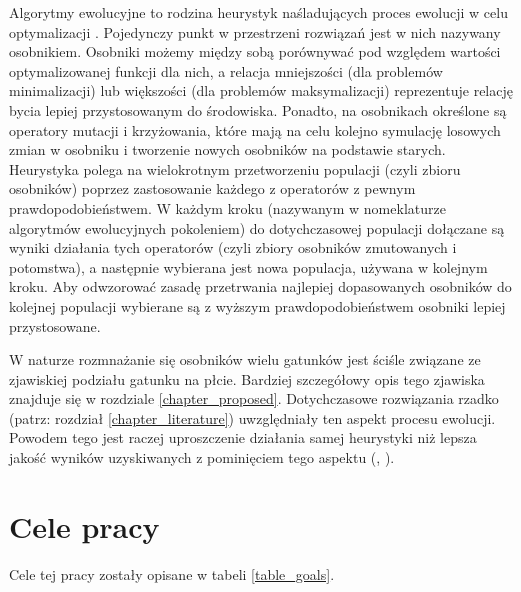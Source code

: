 \documentclass[twoside]{iisthesis}
\begin{document}
Algorytmy ewolucyjne to rodzina heurystyk naśladujących proces ewolucji w celu optymalizacji \cite{davis1991handbook}. Pojedynczy punkt w przestrzeni rozwiązań jest w nich nazywany osobnikiem. Osobniki możemy między sobą porównywać pod względem wartości optymalizowanej funkcji dla nich, a relacja mniejszości (dla problemów minimalizacji) lub większości (dla problemów maksymalizacji) reprezentuje relację bycia lepiej przystosowanym do środowiska. Ponadto, na osobnikach określone są operatory mutacji i krzyżowania, które mają na celu kolejno symulację losowych zmian w osobniku i tworzenie nowych osobników na podstawie starych. Heurystyka polega na wielokrotnym przetworzeniu populacji (czyli zbioru osobników) poprzez zastosowanie każdego z operatorów z pewnym prawdopodobieństwem. W każdym kroku (nazywanym w nomeklaturze algorytmów ewolucyjnych pokoleniem) do dotychczasowej populacji dołączane są wyniki działania tych operatorów (czyli zbiory osobników zmutowanych i potomstwa), a następnie wybierana jest nowa populacja, używana w kolejnym kroku. Aby odwzorować zasadę przetrwania najlepiej dopasowanych osobników do kolejnej populacji wybierane są z wyższym prawdopodobieństwem osobniki lepiej przystosowane.

W naturze rozmnażanie się osobników wielu gatunków jest ściśle związane ze zjawiskiej podziału gatunku na płcie. Bardziej szczegółowy opis tego zjawiska znajduje się w rozdziale \ref{chapter_proposed}. Dotychczasowe rozwiązania rzadko (patrz: rozdział \ref{chapter_literature}) uwzględniały ten aspekt procesu ewolucji. Powodem tego jest raczej uproszczenie działania samej heurystyki niż lepsza jakość wyników uzyskiwanych z pominięciem tego aspektu (\cite{GGA}, \cite{SexualGA}). 

\section{Cele pracy}

Cele tej pracy zostały opisane w tabeli \ref{table_goals}.

\FloatBarrier
\end{document}
